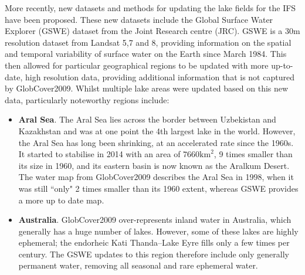 \documentclass[hess, twostagejnl]{copernicus}
\providecommand{\DIFdel}[1]{{\protect\color{red} \scriptsize #1}} %
\providecommand{\DIFdelbegin}{} %
\providecommand{\DIFdelend}{} %
\begin{document}
\DIFdel{More recently, new datasets and methods for updating the lake fields for the IFS have been proposed\cite{Choulga2019}. These new datasets include the Global Surface Water Explorer (GSWE) dataset from the Joint Research centre (JRC)\cite{GSWE}. GSWE is a 30m resolution dataset from Landsat 5,7 }\DIFdelend and \DIFdelbegin \DIFdel{8, providing  information on the spatial and temporal variability of surface water on the Earth since March 1984. This then allowed for particular geographical regions to be updated with more up-to-date, high resolution data, providing additional information that is not captured by GlobCover2009. Whilst multiple lake areas were updated based on this new data, particularly noteworthy regions include:
}%
\begin{itemize}%
\item%
\DIFdel{\textbf{Aral Sea}. The Aral Sea lies across the border between Uzbekistan and Kazakhstan and was at one point the 4th largest lake in the world. However, the Aral Sea has long been shrinking, at an accelerated rate since the 1960s. It started to stabilise in 2014 with an area of $7660 \text{km}^2$, 9 times smaller than its size in 1960, and its eastern basin is now known as the Aralkum Desert. The water map from GlobCover2009 describes the Aral Sea in 1998, when it was still ``only" 2 times smaller than its 1960 extent, whereas GSWE provides a more up to date map. }%
\item%
\DIFdel{\textbf{Australia}. GlobCover2009 over-represents inland water in Australia, which generally has a huge number of lakes. However, some of these lakes are highly ephemeral;  the endorheic Kati Thanda–Lake Eyre fills only a few times per century. The GSWE updates to this region therefore include only generally permanent water, removing all seasonal and rare ephemeral water. 
}
\end{itemize}%
\end{document}
